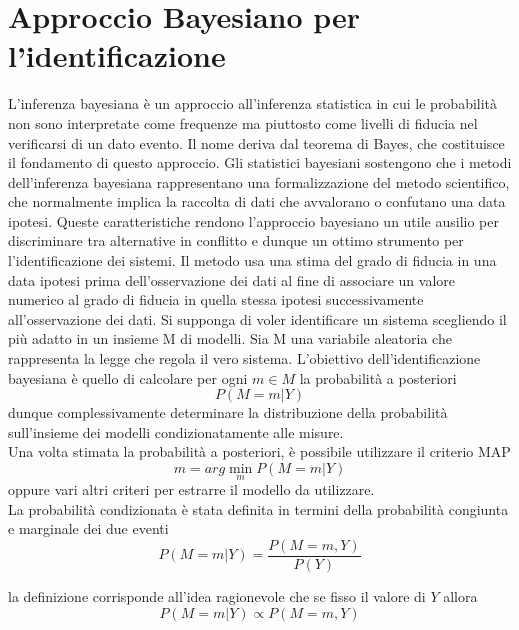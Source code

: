 \documentclass[10pt,a4paper,oneside,openany,noindent]{report}
\begin{document}
\section{Approccio Bayesiano per l’identificazione}
L’inferenza bayesiana è un approccio all’inferenza statistica in cui le probabilità
non sono interpretate come frequenze ma piuttosto come livelli di fiducia nel verificarsi di un dato evento. Il nome deriva dal teorema di Bayes, che costituisce il
fondamento di questo approccio. Gli statistici bayesiani sostengono che i metodi
dell’inferenza bayesiana rappresentano una formalizzazione del metodo scientifico,
che normalmente implica la raccolta di dati che avvalorano o confutano una data
ipotesi.
Queste caratteristiche rendono l’approccio bayesiano un utile ausilio per discriminare tra alternative in conflitto e dunque un ottimo strumento per l’identificazione
dei sistemi.
Il metodo usa una stima del grado di fiducia in una data ipotesi prima dell’osservazione
dei dati al fine di associare un valore numerico al grado di fiducia in quella stessa
ipotesi successivamente all’osservazione dei dati. Si supponga di voler identificare
un sistema scegliendo il più adatto in un insieme M di modelli.
Sia M una variabile aleatoria che rappresenta la legge che regola il vero sistema.
L’obiettivo dell’identificazione bayesiana è quello di calcolare per ogni $m\in M$ la
probabilità a posteriori
\begin{equation} P (M = m|Y )
\end{equation}
dunque complessivamente determinare la distribuzione della probabilità sull’insieme
dei modelli condizionatamente alle misure.\\
Una volta stimata la probabilità a posteriori, è possibile utilizzare il criterio MAP
\begin{equation}
m=arg \min_m P(M = m|Y )
\end{equation} oppure vari altri criteri per estrarre il modello da utilizzare.\\
La probabilità condizionata è stata definita in termini della probabilità congiunta e
marginale dei due eventi
\begin{equation}
P (M = m|Y ) =\frac{
P (M = m, Y )}{
P (Y )}
\end{equation}

la definizione corrisponde all’idea ragionevole che se fisso il valore di $Y$ allora
\begin{equation}
P (M = m|Y ) \propto P (M = m, Y )
\end{equation}
\end{document}
